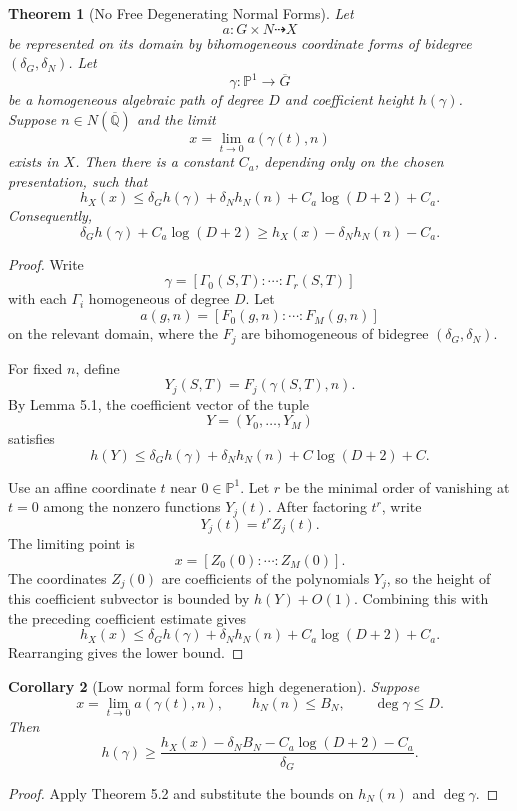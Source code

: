 \documentclass[11pt]{article}
\newtheorem{theorem}{Theorem}[section]
\newtheorem{corollary}[theorem]{Corollary}
\begin{document}
\begin{theorem}[No Free Degenerating Normal Forms]
Let
\[
a:G\times N\dashrightarrow X
\]
be represented on its domain by bihomogeneous coordinate forms of bidegree \((\delta_G,\delta_N)\). Let
\[
\gamma:\mathbb P^1\to\overline G
\]
be a homogeneous algebraic path of degree \(D\) and coefficient height \(h(\gamma)\). Suppose \(n\in N(\overline{\mathbb Q})\) and the limit
\[
x=\lim_{t\to0}a(\gamma(t),n)
\]
exists in \(X\). Then there is a constant \(C_a\), depending only on the chosen presentation, such that
\[
h_X(x)
\leq
\delta_G h(\gamma)+\delta_N h_N(n)
+C_a\log(D+2)+C_a.
\]
Consequently,
\[
\delta_G h(\gamma)+C_a\log(D+2)
\geq
h_X(x)-\delta_N h_N(n)-C_a.
\]
\end{theorem}

\begin{proof}
Write
\[
\gamma=[\Gamma_0(S,T):\cdots:\Gamma_r(S,T)]
\]
with each \(\Gamma_i\) homogeneous of degree \(D\). Let
\[
a(g,n)=[F_0(g,n):\cdots:F_M(g,n)]
\]
on the relevant domain, where the \(F_j\) are bihomogeneous of bidegree \((\delta_G,\delta_N)\).

For fixed \(n\), define
\[
Y_j(S,T)=F_j(\gamma(S,T),n).
\]
By Lemma 5.1, the coefficient vector of the tuple
\[
Y=(Y_0,\ldots,Y_M)
\]
satisfies
\[
h(Y)
\leq
\delta_G h(\gamma)+\delta_N h_N(n)+C\log(D+2)+C.
\]

Use an affine coordinate \(t\) near \(0\in\mathbb P^1\). Let \(r\) be the minimal order of vanishing at \(t=0\) among the nonzero functions \(Y_j(t)\). After factoring \(t^r\), write
\[
Y_j(t)=t^r Z_j(t).
\]
The limiting point is
\[
x=[Z_0(0):\cdots:Z_M(0)].
\]
The coordinates \(Z_j(0)\) are coefficients of the polynomials \(Y_j\), so the height of this coefficient subvector is bounded by \(h(Y)+O(1)\). Combining this with the preceding coefficient estimate gives
\[
h_X(x)
\leq
\delta_G h(\gamma)+\delta_N h_N(n)+C_a\log(D+2)+C_a.
\]
Rearranging gives the lower bound.
\end{proof}

\begin{corollary}[Low normal form forces high degeneration]
Suppose
\[
x=\lim_{t\to0}a(\gamma(t),n),
\qquad
h_N(n)\leq B_N,
\qquad
\deg\gamma\leq D.
\]
Then
\[
h(\gamma)
\geq
\frac{h_X(x)-\delta_N B_N-C_a\log(D+2)-C_a}{\delta_G}.
\]
\end{corollary}

\begin{proof}
Apply Theorem 5.2 and substitute the bounds on \(h_N(n)\) and \(\deg\gamma\).
\end{proof}
\end{document}
